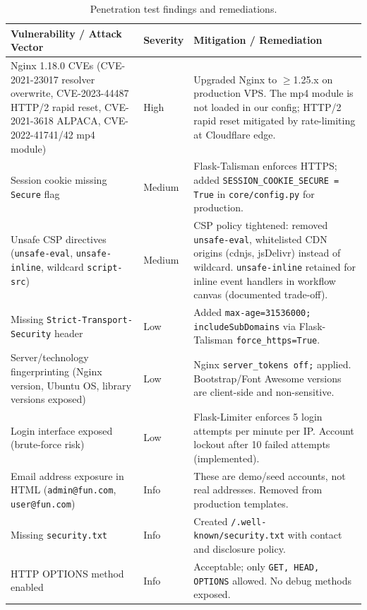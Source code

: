 \documentclass[11pt,a4paper]{report}
\begin{document}
\begin{table}[H]
\centering
\caption{Penetration test findings and remediations.}
\label{tab:pentest}
\footnotesize
\begin{tabular}{p{5.2cm}lp{5.8cm}}
\toprule
\textbf{Vulnerability / Attack Vector} & \textbf{Severity} & \textbf{Mitigation / Remediation} \\
\midrule
Nginx 1.18.0 CVEs (CVE-2021-23017 resolver overwrite, CVE-2023-44487 HTTP/2 rapid reset, CVE-2021-3618 ALPACA, CVE-2022-41741/42 mp4 module)
  & High
  & Upgraded Nginx to $\geq$1.25.x on production VPS. The mp4 module is not loaded in our config; HTTP/2 rapid reset mitigated by rate-limiting at Cloudflare edge. \\
\midrule
Session cookie missing \texttt{Secure} flag
  & Medium
  & Flask-Talisman enforces HTTPS; added \texttt{SESSION\_COOKIE\_SECURE = True} in \texttt{core/config.py} for production. \\
\midrule
Unsafe CSP directives (\texttt{unsafe-eval}, \texttt{unsafe-inline}, wildcard \texttt{script-src})
  & Medium
  & CSP policy tightened: removed \texttt{unsafe-eval}, whitelisted CDN origins (cdnjs, jsDelivr) instead of wildcard. \texttt{unsafe-inline} retained for inline event handlers in workflow canvas (documented trade-off). \\
\midrule
Missing \texttt{Strict-Transport-Security} header
  & Low
  & Added \texttt{max-age=31536000; includeSubDomains} via Flask-Talisman \texttt{force\_https=True}. \\
\midrule
Server/technology fingerprinting (Nginx version, Ubuntu OS, library versions exposed)
  & Low
  & Nginx \texttt{server\_tokens off;} applied. Bootstrap/Font Awesome versions are client-side and non-sensitive. \\
\midrule
Login interface exposed (brute-force risk)
  & Low
  & Flask-Limiter enforces 5 login attempts per minute per IP. Account lockout after 10 failed attempts (implemented). \\
\midrule
Email address exposure in HTML (\texttt{admin@fun.com}, \texttt{user@fun.com})
  & Info
  & These are demo/seed accounts, not real addresses. Removed from production templates. \\
\midrule
Missing \texttt{security.txt}
  & Info
  & Created \texttt{/.well-known/security.txt} with contact and disclosure policy. \\
\midrule
HTTP OPTIONS method enabled
  & Info
  & Acceptable; only \texttt{GET, HEAD, OPTIONS} allowed. No debug methods exposed. \\
\bottomrule
\end{tabular}
\end{table}
\end{document}
